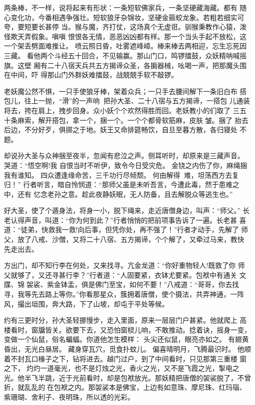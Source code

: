 两条棒，不一样，说将起来有形状：一条短软佛家兵，一条坚硬藏海藏。都有
随心变化功，今番相遇争强壮。短软狼牙杂锦妆，坚硬金箍蛟龙象。若粗若细实可
夸，要短要长甚停
当。猴与魔，齐打仗，这场真个无虚诳。驯猴秉教作心猿，泼怪欺天弄假象。嗔嗔
恨恨各无情，恶恶凶凶都有样。那一个当头手起不放松，这一个架丢劈面难推让。
喷云照日昏，吐雾遮峰嶂。棒来棒去两相迎，忘生忘死因三藏。
看他两个斗经五十回合，不见输赢。那山门口，鸣锣擂鼓，众妖精呐喊摇旗。这壁
厢有二十八宿天兵共五方揭谛众圣，各掮器械，吆喝一声，把那魔头围在中间，吓
得那山门外群妖难擂鼓，战兢兢手软不敲锣。

老妖魔公然不惧，一只手使狼牙棒，架着众兵；一只手去腰间解下一条旧白布
搭包儿，往上一抛，“滑”的一声响，把孙大圣、二十八宿与五方揭谛，一搭包
儿通装将去，挎在肩上，拽步回身。众小妖个个欢然得胜而回。老妖教小的们取了
三五十条麻索，解开搭包，拿一个，捆一个。一个个都骨软筋麻，皮肤皱。捆了
抬去后边，不分好歹，俱掷之于地。妖王又命排筵畅饮，自旦至暮方散，各归寝处
不题。

却说孙大圣与众神捆至夜半，忽闻有悲泣之声。侧耳听时，却原来是三藏声音。
哭道：“悟空啊!我
自恨当时不听伊，致令今日受灾危。
金铙之内伤了你，麻绳捆我有谁知。
四众遭逢缘命苦，三千功行尽倾颓。
何由解得难，坦荡西方去复归！”
行者听言，暗自怜悯道：“那师父虽是未听吾言，今遭此毒，然于患难之中，还有
忆念老孙之意。趁此夜静妖眠，无人防备，且去解脱众等逃生也。”

好大圣，使了个遁身法，将身一小，脱下绳来，走近唐僧身边，叫声：“师父。”
长老认得声音，叫道：“你为何到此？”行者悄悄的把前项事告诉了一遍。长老甚
喜道：“徒弟，快救我一救!向后事，但凭你处，再不强了！”行者才动手，先解了
师父，放了八戒、沙僧，又将二十八宿、五方揭谛，个个解了，又牵过马来，教快
先走出去。

方出门，却不知行李在何处，又来找寻。亢金龙道：“你好重物轻人!既救了你
师父就够了，又还寻甚行李？”行者道：“人固要紧，衣钵尤要紧。包袱中有通关
文牒、锦袈裟、紫金钵盂，俱是佛门至宝，如何不要！”八戒道：“哥哥，你去找
寻，我等先去路上等你。”你看那星众，簇拥着唐僧，使个摄法，共弄神通，一阵
风，撮出垣围，奔大路，下了山坡，却屯于平处等候。

约有三更时分，孙大圣轻挪慢步，走入里面，原来一层层门户甚紧。他就爬上
高楼看时，窗牖皆关。欲要下去，又恐怕窗棂儿响，不敢推动。捻着诀，摇身一变，
变做一个仙鼠，俗名蝙蝠。你道他怎生模样：
头尖还似鼠，眼亮亦如之。
有翅黄昏出，无光白昼居。
藏身穿瓦穴，觅食扑蚊儿。
偏喜晴明月，飞腾最识时。
他顺着不封瓦口椽子之下，钻将进去。越门过户，到了中间看时，只见那第三重楼
窗之下，灼灼一道毫光，也不是灯烛之光，香火之光，又不是飞霞之光，掣电之
光。他半飞半跳，近于光前看时，却是包袱放光。那妖精把唐僧的袈裟脱了，不曾
折，就乱乱的在包袱之内。那袈裟本是佛宝，上边有如意珠、摩尼珠、红玛瑙、
紫珊瑚、舍利子、夜明珠，所以透的光彩。

